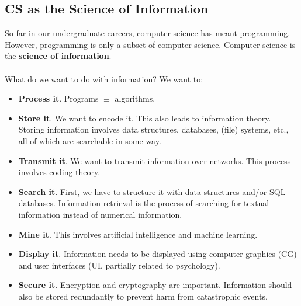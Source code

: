 \documentclass[]{article}
\theoremstyle{definition}
\begin{document}
		\subsection{CS as the Science of Information}
			So far in our undergraduate careers, computer science has meant programming. However, programming is only a subset of computer science. Computer science is the \textbf{science of information}.
			\\ \\
			What do we want to do with information? We want to:
			\begin{itemize}
				\item \textbf{Process it}. Programs $\equiv$ algorithms.
				\item \textbf{Store it}. We want to encode it. This also leads to information theory. Storing information involves data structures, databases, (file) systems, etc., all of which are searchable in some way.
				\item \textbf{Transmit it}. We want to transmit information over networks. This process involves coding theory.
				\item \textbf{Search it}. First, we have to structure it with data structures and/or SQL databases. Information retrieval is the process of searching for textual information instead of numerical information.
				\item \textbf{Mine it}. This involves artificial intelligence and machine learning.
				\item \textbf{Display it}. Information needs to be displayed using computer graphics (CG) and user interfaces (UI, partially related to psychology).
				\item \textbf{Secure it}. Encryption and cryptography are important. Information should also be stored redundantly to prevent harm from catastrophic events.
			\end{itemize}
	
\end{document}
